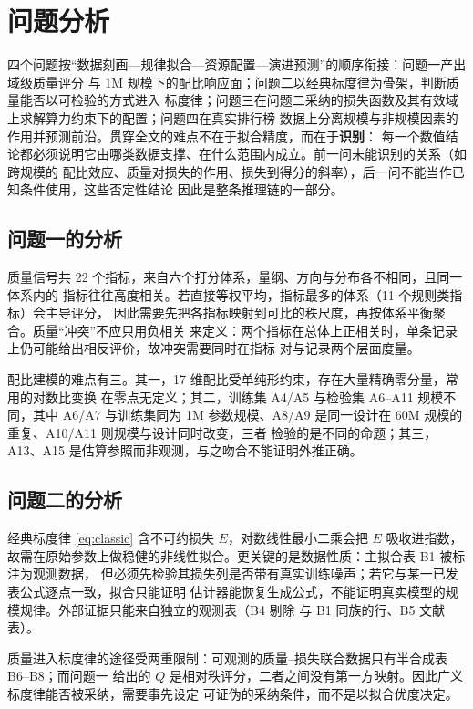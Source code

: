 \section{问题分析}

四个问题按“数据刻画—规律拟合—资源配置—演进预测”的顺序衔接：问题一产出域级质量评分
与 1M 规模下的配比响应面；问题二以经典标度律为骨架，判断质量能否以可检验的方式进入
标度律；问题三在问题二采纳的损失函数及其有效域上求解算力约束下的配置；问题四在真实排行榜
数据上分离规模与非规模因素的作用并预测前沿。贯穿全文的难点不在于拟合精度，而在于\textbf{识别}：
每一个数值结论都必须说明它由哪类数据支撑、在什么范围内成立。前一问未能识别的关系（如跨规模的
配比效应、质量对损失的作用、损失到得分的斜率），后一问不能当作已知条件使用，这些否定性结论
因此是整条推理链的一部分。

\subsection{问题一的分析}

质量信号共 22 个指标，来自六个打分体系，量纲、方向与分布各不相同，且同一体系内的
指标往往高度相关。若直接等权平均，指标最多的体系（11 个规则类指标）会主导评分，
因此需要先把各指标映射到可比的秩尺度，再按体系平衡聚合。质量“冲突”不应只用负相关
来定义：两个指标在总体上正相关时，单条记录上仍可能给出相反评价，故冲突需要同时在指标
对与记录两个层面度量。

配比建模的难点有三。其一，17 维配比受单纯形约束，存在大量精确零分量，常用的对数比变换
在零点无定义；其二，训练集 A4/A5 与检验集 A6--A11 规模不同，其中 A6/A7 与训练集同为
1M 参数规模、A8/A9 是同一设计在 60M 规模的重复、A10/A11 则规模与设计同时改变，三者
检验的是不同的命题；其三，A13、A15 是估算参照而非观测，与之吻合不能证明外推正确。

\subsection{问题二的分析}

经典标度律 \eqref{eq:classic} 含不可约损失 $E$，对数线性最小二乘会把 $E$ 吸收进指数，
故需在原始参数上做稳健的非线性拟合。更关键的是数据性质：主拟合表 B1 被标注为观测数据，
但必须先检验其损失列是否带有真实训练噪声；若它与某一已发表公式逐点一致，拟合只能证明
估计器能恢复生成公式，不能证明真实模型的规模规律。外部证据只能来自独立的观测表（B4 剔除
与 B1 同族的行、B5 文献表）。

质量进入标度律的途径受两重限制：可观测的质量–损失联合数据只有半合成表 B6--B8；而问题一
给出的 $Q$ 是相对秩评分，二者之间没有第一方映射。因此广义标度律能否被采纳，需要事先设定
可证伪的采纳条件，而不是以拟合优度决定。

